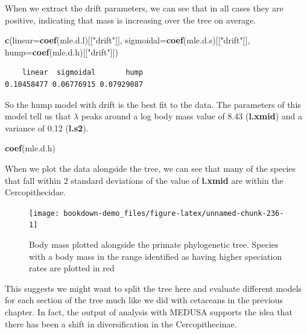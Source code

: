 \documentclass[
]{book}
\newenvironment{Shaded}{\begin{snugshade}}{\end{snugshade}}
\newcommand{\DataTypeTok}[1]{\textcolor[rgb]{0.13,0.29,0.53}{#1}}
\newcommand{\KeywordTok}[1]{\textcolor[rgb]{0.13,0.29,0.53}{\textbf{#1}}}
\newcommand{\NormalTok}[1]{#1}
\newcommand{\StringTok}[1]{\textcolor[rgb]{0.31,0.60,0.02}{#1}}
\begin{document}
When we extract the drift parameters, we can see that in all cases they are positive, indicating that mass is increasing over the tree on average.

\begin{Shaded}
\begin{Highlighting}[]
\KeywordTok{c}\NormalTok{(}\DataTypeTok{linear=}\KeywordTok{coef}\NormalTok{(mle.d.l)[[}\StringTok{"drift"}\NormalTok{]], }
  \DataTypeTok{sigmoidal=}\KeywordTok{coef}\NormalTok{(mle.d.s)[[}\StringTok{"drift"}\NormalTok{]], }
  \DataTypeTok{hump=}\KeywordTok{coef}\NormalTok{(mle.d.h)[[}\StringTok{"drift"}\NormalTok{]])}
\end{Highlighting}
\end{Shaded}

\begin{verbatim}
    linear  sigmoidal       hump 
0.10458477 0.06776915 0.07929087 
\end{verbatim}

So the hump model with drift is the best fit to the data. The parameters of this model tell us that \(\lambda\) peaks around a log body mass value of 8.43 (\textbf{l.xmid}) and a variance of 0.12 (\textbf{l.s2}).

\begin{Shaded}
\begin{Highlighting}[]
\KeywordTok{coef}\NormalTok{(mle.d.h)}
\end{Highlighting}
\end{Shaded}

When we plot the data alongside the tree, we can see that many of the species that fall within 2 standard deviations of the value of \textbf{l.xmid} are within the Cercopithecidae.

\begin{figure}[H]

{\centering \texttt{[image: bookdown-demo\_files/figure-latex/unnamed-chunk-236-1]} 

}

\caption{Body mass plotted alongside the primate phylogenetic tree. Species with a body mass in the range identified as having higher speciation rates are plotted in red}\label{fig:unnamed-chunk-236}
\end{figure}

This suggests we might want to split the tree here and evaluate different models for each section of the tree much like we did with cetaceans in the previous chapter. In fact, the output of analysis with MEDUSA supports the idea that there has been a shift in diversification in the Cercopithecinae.
\end{document}
